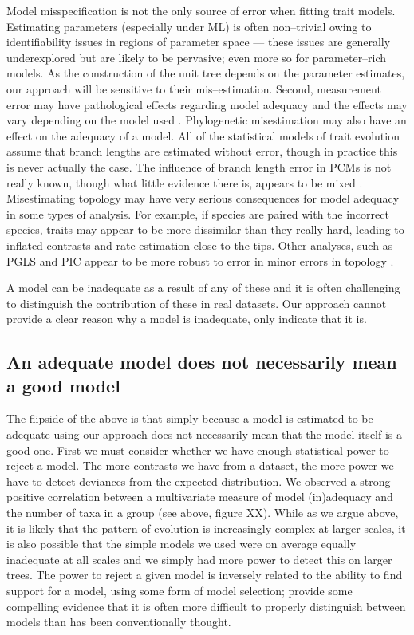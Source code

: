 \documentclass[a4paper,12pt]{article}
\begin{document}
Model misspecification is not the only source of error when fitting trait models. Estimating parameters (especially under ML) is often non--trivial owing to identifiability issues in regions of parameter space \citep{Ane2008, HoAne2012} --- these issues are generally underexplored but are likely to be pervasive; even more so for parameter--rich models. As the construction of the unit tree depends on the parameter estimates, our approach will be sensitive to their mis--estimation. Second, measurement error may have pathological effects regarding model adequacy \citep{HarmonLosos2005} and the effects may vary depending on the model used \citep{RevellReynolds2012, PennellPE}. Phylogenetic misestimation may also have an effect on the adequacy of a model. All of the statistical models of trait evolution assume that branch lengths are estimated without error, though in practice this is never actually the case. The influence of branch length error in PCMs is not really known, though what little evidence there is, appears to be mixed \citep{Revell2005, WertheimSanderson2011}. Misestimating topology may have very serious consequences for model adequacy in some types of analysis. For example, if species are paired with the incorrect species, traits may appear to be more dissimilar than they really hard, leading to inflated contrasts and rate estimation close to the tips. Other analyses, such as PGLS and PIC appear to be more robust to error in minor errors in topology \citep{Martinspaper, Losos199x}.

A model can be inadequate as a result of any of these and it is often challenging to distinguish the contribution of these in real datasets. Our approach cannot provide a clear reason why a model is inadequate, only indicate that it is.

\subsection*{An adequate model does not necessarily mean a good model}
The flipside of the above is that simply because a model is estimated to be adequate using our approach does not necessarily mean that the model itself is a good one. First we must consider whether we have enough statistical power to reject a model. The more contrasts we have from a dataset, the more power we have to detect deviances from the expected distribution. We observed a strong positive correlation between a multivariate measure of model (in)adequacy and the number of taxa in a group (see above, figure XX). While as we argue above, it is likely that the pattern of evolution is increasingly complex at larger scales, it is also possible that the simple models we used were on average equally inadequate at all scales and we simply had more power to detect this on larger trees. The power to reject a given model is inversely related to the ability to find support for a model, using some form of model selection; \citet{Boettiger2012} provide some compelling evidence that it is often more difficult to properly distinguish between models than has been conventionally thought.
\end{document}

